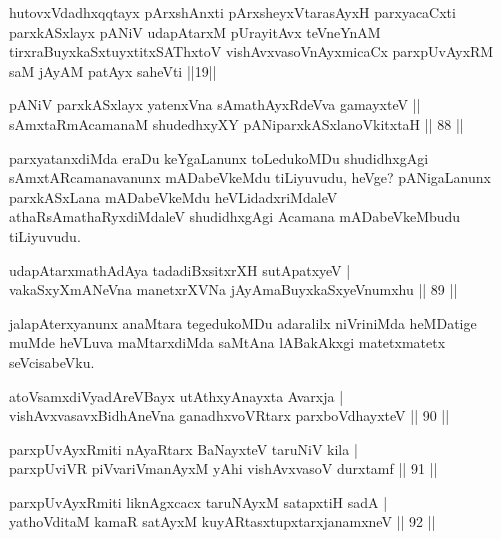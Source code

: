 \begin{shl}
hutovxVdadhxqqtayx pArxshAnxti pArxsheyxVtarasAyxH parxyacaCxti parxkASxlayx pANiV udapAtarxM pUrayitAvx teVneYnAM tirxraBuyxkaSxtuyxtitxSAThxtoV vishAvxvasoV\s nAyxmicaCx parxpUvAyxRM saM jAyAM patAyx saheVti ||19||
\end{shl}

\begin{shl}
pANiV parxkASxlayx yatenxVna sAmathAyxRdeVva gamayxteV || \\
sAmxtaRmAcamanaM shudedhxyXY pANiparxkASxlanoVkitxtaH \hfill|| 88 || 
\end{shl}

\begin{artha}
parxyatanxdiMda eraDu keYgaLanunx toLedukoMDu shudidhxgAgi 
sAmxtARcamanavanunx mADabeVkeMdu tiLiyuvudu, heVge? pANigaLanunx 
parxkASxLana mADabeVkeMdu heVLidadxriMdaleV athaRsAmathaRyxdiMdaleV
shudidhxgAgi Acamana mADabeVkeMbudu tiLiyuvudu.
\end{artha}


\begin{shl}
udapAtarxmathA\s \s dAya tadadiBxsitxrXH sutApatxyeV | \\
vakaSxyXmANeVna manetxrXVNa jAyAmaBuyxkaSxyeVnumxhu \hfill|| 89 || 
\end{shl}

\begin{artha}
jalapAterxyanunx anaMtara tegedukoMDu adaralilx niVriniMda heMDatige muMde heVLuva maMtarxdiMda saMtAna lABakAkxgi matetxmatetx seVcisabeVku.
\end{artha}


\begin{shl}
atoV\s samxdiVyadAreVBayx utAthxyAnayxta Avarxja | \\
vishAvxvasavxBidhAneVna ganadhxvoVR\s tarx parxboVdhayxteV \hfill|| 90 || 
\end{shl}

\begin{shl}
parxpUvAyxRmiti nAyaRtarx BaNayxteV taruNiV kila | \\
parxpUviVR piVvariVmanAyxM yAhi vishAvxvasoV durxtamf \hfill|| 91 || 
\end{shl}

\begin{shl}
parxpUvAyxRmiti liknAgxcacx taruNAyxM satapxtiH sadA | \\
yathoVditaM kamaR satAyxM kuyARtasxtupxtarxjanamxneV \hfill|| 92 || 
\end{shl}

